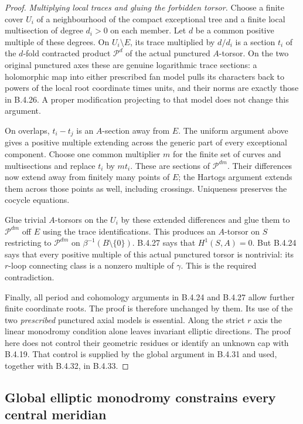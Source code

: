 \begin{proof}
\emph{Multiplying local traces and gluing the forbidden torsor.}
Choose a finite cover $U_i$ of a
neighbourhood of the compact exceptional
tree and a finite local multisection of
degree $d_i>0$ on each member. Let $d$ be
a common positive multiple of these degrees.
On $U_i\setminus E$, its trace multiplied
by $d/d_i$ is a section $t_i$ of the
$d$-fold contracted product $\mathcal P^d$
of the actual punctured $A$-torsor.
On the two original punctured axes these
are genuine logarithmic trace sections:
a holomorphic map into either prescribed
fan model pulls its characters back to
powers of the local root coordinate times
units, and their norms are exactly those
in B.4.26. A proper modification projecting
to that model does not change this argument.

On overlaps, $t_i-t_j$ is an $A$-section
away from $E$. The uniform argument above
gives a positive multiple extending across
the generic part of every exceptional
component. Choose one common multiplier
$m$ for the finite set of curves and
multisections and replace $t_i$ by $mt_i$.
These are sections of $\mathcal P^{dm}$.
Their differences now extend away from
finitely many points of $E$; the Hartogs
argument extends them across those points
as well, including crossings. Uniqueness
preserves the cocycle equations.

Glue trivial $A$-torsors on the $U_i$ by
these extended differences and glue them
to $\mathcal P^{dm}$ off $E$ using the
trace identifications. This produces an
$A$-torsor on $S$ restricting to
$\mathcal P^{dm}$ on
$\beta^{-1}(B\setminus\{0\})$.
B.4.27 says that $H^1(S,A)=0$.
But B.4.24 says that every positive
multiple of this actual punctured torsor
is nontrivial: its $r$-loop connecting
class is a nonzero multiple of $\gamma$.
This is the required contradiction.

Finally, all period and cohomology arguments
in B.4.24 and B.4.27 allow further finite
coordinate roots. The proof is therefore
unchanged by them. Its use of the two
\emph{prescribed} punctured axial models
is essential. Along the strict $r$ axis the linear monodromy
condition alone leaves invariant elliptic directions.
The proof here does not control their geometric
residues or identify an unknown cap with B.4.19.
That control is supplied by the global argument in
B.4.31 and used, together with B.4.32, in B.4.33.
\end{proof}

\subsection{Global elliptic monodromy constrains every central meridian}

